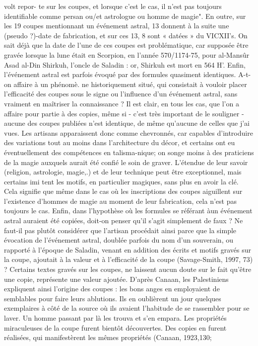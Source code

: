 volt repor-
te sur les coupes, et lorsque c'est le cas, il n'est pas toujours identifiable comme persan ou/et astrologue ou homme de magie". En outre, sur les 19 coupes mentionnant un événement astral, 13 donnent à la suite une (pseudo ?)-date de fabrication, et sur ces 13, 8 sont « datées » du VICXII's.
On sait déjà que la date de l'une de ces coupes est problématique, car supposée être gravée lorsque la lune était en Scorpion, en l'année
570/1174-75, pour al-Mansûr Asad al-Din Shirkuh, l'oncle de Saladin : or, Shirkuh est mort en 564 H'. Enfin, l'événement astral est parfois évoqué par des formules quasiment identiques. A-t-on affaire à un phénomè. ne historiquement situé, qui consistait à vouloir placer l'efficacité des coupes sous le signe ou l'influence d'un événement astral, sans vraiment en maîtriser la connaissance ? Il est clair, en tous les cas, que l'on a affaire pour partie à des copies, même si - c'est très important de le souligner
- aucune des coupes publiées n'est identique, de même qu'aucune de celles que j'ai vues. Les artisans apparaissent donc comme chevronnés, car capables d'introduire des variations tout au moins dans l'architecture du décor, et certains ont eu éventuellement des compétences en talisma-nique; on songe moins à des praticiens de la magie auxquels aurait été confié le soin de graver. L'étendue de leur savoir (religion, astrologie, magie,.) et de leur technique peut être exceptionnel, mais certains imi tent les motifs, en particulier magiques, sans plus en avoir la clé. Cela signifie que même dans le cas où les inscriptions des coupes aiguillent sur l'existence d'hommes de magie au moment de leur fabrication, cela n'est pas toujours le cas. Enfin, dans l'hypothèse où les formules se référant àun événement astral auraient été copiées, doit-on penser qu'il s'agit simplement de faux ? Ne faut-il pas plutôt considérer que l'artisan procédait ainsi parce que la simple évocation de l'événement astral, doublée parfois du nom d'un souverain, ou rapporté à l'époque de Saladin, venant en addition des écrits et motifs gravés sur la coupe, ajoutait à la valeur et à l'efficacité de la coupe (Savage-Smith, 1997, 73) ? Certains textes gravés sur les coupes, ne laissent aucun doute sur le fait qu'être une copie, représente une valeur ajoutée. D'après Canaan, les Palestiniens expliquent ainsi l'origine des coupes : les bons anges en employaient de semblables pour faire leurs ablutions. Ils en oublièrent un jour quelques exemplaires à côté de la source où ils avaient l'habitude de se rassembler pour se laver. Un homme passant par là les trouva et s'en empara. Les propriétés miraculeuses de la coupe furent bientôt découvertes. Des copies en furent réalisées, qui manifestèrent les mêmes propriétés (Canaan, 1923,130;
